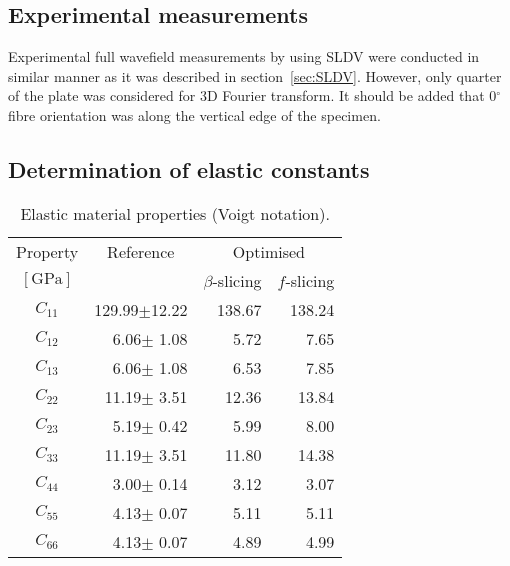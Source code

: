 \documentclass[preprint,12pt]{elsarticle}
\begin{document}
\subsection{Experimental measurements}
Experimental full wavefield measurements by using SLDV were conducted in similar manner as it was described in section~\ref{sec:SLDV}. 
However, only quarter of the plate was considered for 3D Fourier transform.
It should be added that 0\(^{\circ}\) fibre orientation was along the vertical edge of the specimen.
\subsection{Determination of elastic constants}
\begin{table}[h]
	\renewcommand{\arraystretch}{1.3}
	\centering \footnotesize
	\caption{Elastic material properties (Voigt notation).}
	\begin{tabular}{crrr} 
		\toprule
		Property & \multicolumn{1}{c}{Reference} & \multicolumn{2}{c}{Optimised}\\
		\cmidrule(lr){3-4}
		$\left[\textrm{GPa}\right]$ & \multicolumn{1}{c}{\cite{Moll2019}} & $\beta$-slicing & $f$-slicing \\ 
		\midrule 
		$C_{11}$ & 129.99$\pm$12.22  & 138.67 & 138.24 \\ 
		$C_{12}$ &   6.06$\pm$ 1.08  & 5.72   & 7.65\\ 
		$C_{13}$ &   6.06$\pm$ 1.08  & 6.53   & 7.85\\
		$C_{22}$ &  11.19$\pm$ 3.51  & 12.36  & 13.84\\
		$C_{23}$ &   5.19$\pm$ 0.42  & 5.99  & 8.00\\
		$C_{33}$ &  11.19$\pm$ 3.51  & 11.80 & 14.38\\
		$C_{44}$ &   3.00$\pm$ 0.14  & 3.12  & 3.07\\
		$C_{55}$ &   4.13$\pm$ 0.07  & 5.11  & 5.11\\
		$C_{66}$ &   4.13$\pm$ 0.07  & 4.89  & 4.99 \\
		\bottomrule
	\end{tabular} 
	\label{tab:mat_prop_identified_Moll}
\end{table}
\end{document}
